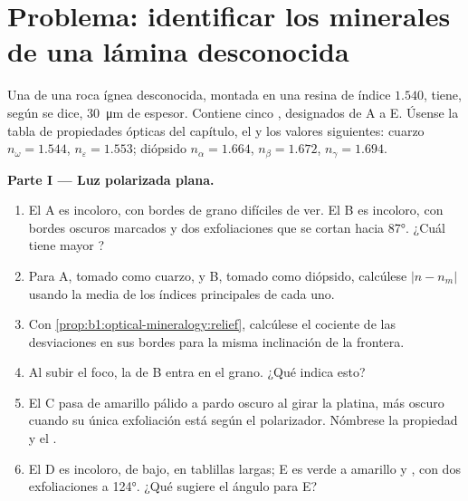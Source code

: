 \section{Problema: identificar los minerales de una lámina desconocida}

\begin{problem}
\label{pb:b1:optical-mineralogy:1}
Una  de una roca ígnea desconocida, montada en una resina de índice $1.540$, tiene, según se dice,
\qty{30}{\micro m} de espesor. Contiene cinco , designados de A a E. Úsense la tabla de propiedades ópticas del
capítulo, el  y los valores siguientes: cuarzo $n_\omega = 1.544$, $n_\varepsilon = 1.553$; diópsido
$n_\alpha = 1.664$, $n_\beta = 1.672$, $n_\gamma = 1.694$.

\medskip
\noindent\textbf{Parte I --- Luz polarizada plana.}
\begin{enumerate}
  \item El  A es incoloro, con bordes de grano difíciles de ver. El  B es incoloro, con bordes oscuros
        marcados y dos exfoliaciones que se cortan hacia \ang{87}. ¿Cuál tiene mayor ?
  \item Para A, tomado como cuarzo, y B, tomado como diópsido, calcúlese $|n - n_m|$ usando la media de los índices
        principales de cada uno.
  \item Con \cref{prop:b1:optical-mineralogy:relief}, calcúlese el cociente de las desviaciones en sus bordes para la misma
        inclinación de la frontera.
  \item Al subir el foco, la  de B entra en el grano. ¿Qué indica esto?
  \item El  C pasa de amarillo pálido a pardo oscuro al girar la platina, más oscuro cuando su única exfoliación
        está según el polarizador. Nómbrese la propiedad y el .
  \item El  D es incoloro, de  bajo, en tablillas largas; E es verde a amarillo y , con dos
        exfoliaciones a \ang{124}. ¿Qué sugiere el ángulo para E?
\end{enumerate}


\end{problem}
